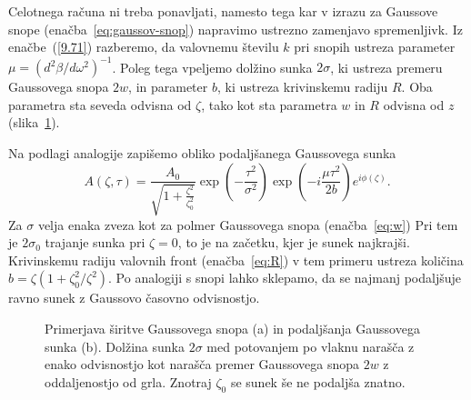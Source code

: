 Celotnega računa
ni treba ponavljati, namesto tega kar v izrazu za Gaussove snope 
(enačba~\ref{eq:gaussov-snop}) napravimo ustrezno zamenjavo spremenljivk. 
Iz enačbe~(\ref{9.71}) razberemo, da valovnemu številu $k$ pri snopih  
ustreza parameter $\mu=(d^{2}\beta/d\omega^{2})^{-1}$. Poleg tega vpeljemo
dolžino sunka $2\sigma$, ki ustreza premeru Gaussovega snopa $2w$, in parameter
$b$, ki ustreza krivinskemu radiju $R$. Oba parametra sta seveda odvisna od $\zeta$, 
tako kot sta parametra $w$ in $R$ odvisna od $z$ (slika~\ref{fig:Gausstau}). 

Na podlagi analogije zapišemo obliko podaljšanega Gaussovega sunka
\begin{equation}
A\left(\zeta,\tau\right)=\frac{A_{0}}{\sqrt{1+\frac{\zeta^{2}
}{\zeta_{0}^{2}}}}\exp\left(-\frac{\tau^{2}}{\sigma^{2}}\right)\exp
\left(-i\frac{\mu\tau^{2}}{2b}\right)e^{i\phi\left(\zeta\right)}.
\label{9.72}
\end{equation}
Za $\sigma$ velja enaka zveza kot za polmer 
Gaussovega snopa (enačba~\ref{eq:w})
Pri tem je $2\sigma_{0}$ trajanje sunka pri $\zeta=0$, to je na začetku,
kjer je sunek najkrajši. Krivinskemu radiju valovnih front (enačba~\ref{eq:R}) v tem primeru
ustreza količina $b=\zeta\left(1+\zeta_{0}^{2}/\zeta^{2}\right)$.
Po analogiji s snopi lahko sklepamo, da se najmanj 
podaljšuje ravno sunek z Gaussovo časovno odvisnostjo. 
\begin{figure}[ht]
\centering
\def\svgwidth{120truemm} 

\caption{Primerjava širitve Gaussovega snopa (a) in podaljšanja Gaussovega sunka (b).
Dolžina sunka $2\sigma$ med potovanjem po vlaknu narašča z enako odvisnostjo kot 
narašča premer Gaussovega snopa $2w$ z oddaljenostjo od grla. Znotraj $\zeta_0$ se sunek
še ne podaljša znatno.}
\label{fig:Gausstau}
\end{figure}

